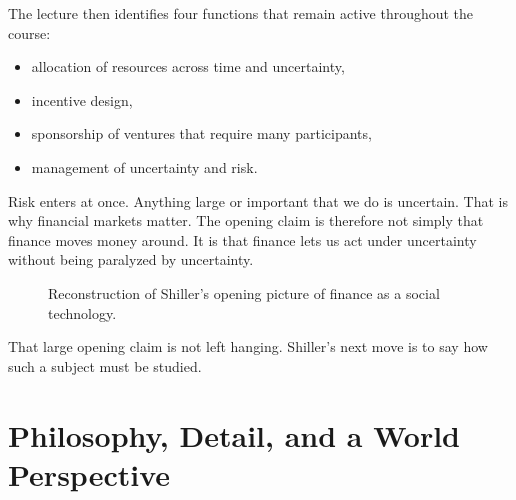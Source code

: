 The lecture then identifies four functions that remain active throughout the course:

\begin{itemize}
\item allocation of resources across time and uncertainty,
\item incentive design,
\item sponsorship of ventures that require many participants,
\item management of uncertainty and risk.
\end{itemize}

Risk enters at once. Anything large or important that we do is uncertain. That is why financial markets matter. The opening claim is therefore not simply that finance moves money around. It is that finance lets us act under uncertainty without being paralyzed by uncertainty.

\begin{figure}[h]
\centering
{}
\caption{Reconstruction of Shiller's opening picture of finance as a social technology.}
\end{figure}

That large opening claim is not left hanging. Shiller's next move is to say how such a subject must be studied.

\section{Philosophy, Detail, and a World Perspective}

